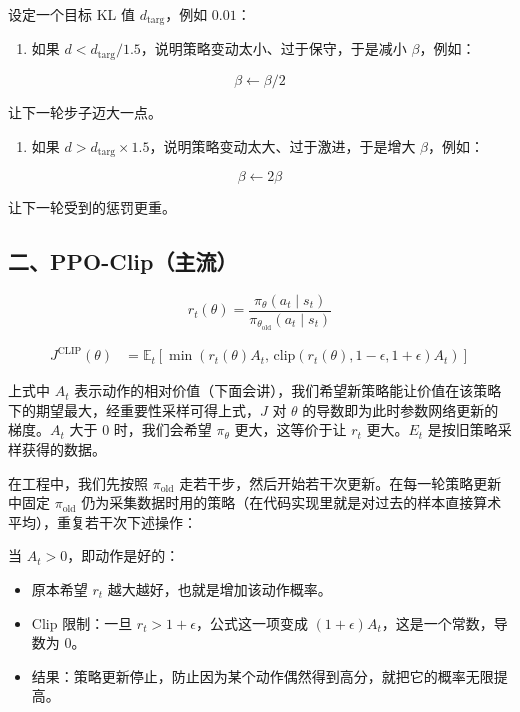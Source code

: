 设定一个目标 KL 值 \(d_{\mathrm{targ}}\)，例如 \(0.01\)：

\begin{enumerate}
\def\labelenumi{\arabic{enumi}.}
\tightlist
\item
  如果 \(d < d_{\mathrm{targ}}/1.5\)，说明策略变动太小、过于保守，于是减小 \(\beta\)，例如：
\end{enumerate}

\[
\beta \leftarrow \beta/2
\]

让下一轮步子迈大一点。

\begin{enumerate}
\def\labelenumi{\arabic{enumi}.}
\setcounter{enumi}{1}
\tightlist
\item
  如果 \(d > d_{\mathrm{targ}}\times 1.5\)，说明策略变动太大、过于激进，于是增大 \(\beta\)，例如：
\end{enumerate}

\[
\beta \leftarrow 2\beta
\]

让下一轮受到的惩罚更重。

\hypertarget{ux4e8cppo-clipux4e3bux6d41}{%
\subsection{二、PPO-Clip（主流）}\label{ux4e8cppo-clipux4e3bux6d41}}

\[
r_t(\theta)=\frac{\pi_\theta(a_t\mid s_t)}{\pi_{\theta_{\mathrm{old}}}(a_t\mid s_t)}
\]

\[
\begin{aligned}
J^{\mathrm{CLIP}}(\theta)
&=
\mathbb{E}_t\left[
\min\left(
r_t(\theta)A_t,\,
\mathrm{clip}(r_t(\theta),1-\epsilon,1+\epsilon)A_t
\right)
\right]
\end{aligned}
\]

上式中 \(A_t\) 表示动作的相对价值（下面会讲），我们希望新策略能让价值在该策略下的期望最大，经重要性采样可得上式，\(J\) 对 \(\theta\) 的导数即为此时参数网络更新的梯度。\(A_t\) 大于 \(0\) 时，我们会希望 \(\pi_\theta\) 更大，这等价于让 \(r_t\) 更大。\(E_t\) 是按旧策略采样获得的数据。

在工程中，我们先按照 \(\pi_{\mathrm{old}}\) 走若干步，然后开始若干次更新。在每一轮策略更新中固定 \(\pi_{\mathrm{old}}\) 仍为采集数据时用的策略（在代码实现里就是对过去的样本直接算术平均），重复若干次下述操作：

当 \(A_t>0\)，即动作是好的：

\begin{itemize}
\tightlist
\item
  原本希望 \(r_t\) 越大越好，也就是增加该动作概率。
\item
  Clip 限制：一旦 \(r_t>1+\epsilon\)，公式这一项变成 \((1+\epsilon)A_t\)，这是一个常数，导数为 \(0\)。
\item
  结果：策略更新停止，防止因为某个动作偶然得到高分，就把它的概率无限提高。
\end{itemize}

